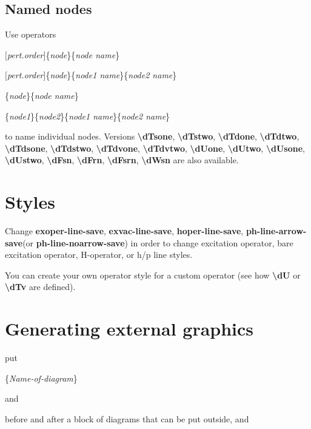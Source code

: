 \documentclass[a4paper]{article}
\newcommand{\myind}{\hspace{10pt}}
\begin{document}
\subsection{Named nodes}

Use operators

\myind{\bf \textbackslash dTone}$[${\it pert.order}$]$\{{\it node}\}\{{\it node name}\}

\myind{\bf \textbackslash dTtwo}$[${\it pert.order}$]$\{{\it node}\}\{{\it node1 name}\}\{{\it node2 name}\}

\myind{\bf \textbackslash dFn}\{{\it node}\}\{{\it node name}\}

\myind{\bf \textbackslash dWn}\{{\it node1}\}\{{\it node2}\}\{{\it node1 name}\}\{{\it node2 name}\}

to name individual nodes. Versions
{\bf \textbackslash dTsone},
{\bf \textbackslash dTstwo},
{\bf \textbackslash dTdone},
{\bf \textbackslash dTdtwo},
{\bf \textbackslash dTdsone},
{\bf \textbackslash dTdstwo},
{\bf \textbackslash dTdvone},
{\bf \textbackslash dTdvtwo},
{\bf \textbackslash dUone},
{\bf \textbackslash dUtwo},
{\bf \textbackslash dUsone},
{\bf \textbackslash dUstwo},
{\bf \textbackslash dFsn},
{\bf \textbackslash dFrn},
{\bf \textbackslash dFsrn},
{\bf \textbackslash dWsn}
are also available.

\section{Styles}\label{sec:Styles}

Change {\bf exoper-line-save}, {\bf exvac-line-save}, {\bf hoper-line-save}, {\bf ph-line-arrow-save}(or {\bf ph-line-noarrow-save})
in order to change excitation operator, bare excitation operator, H-operator, or h/p line styles.

You can create your own operator style for a custom operator (see how {\bf \textbackslash dU} or {\bf \textbackslash dTv} are 
defined).

\section{Generating external graphics}

put 

\myind{\bf \textbackslash beginpgfgraphicnamed}\{{\it Name-of-diagram}\}

and

\myind{\bf \textbackslash endpgfgraphicnamed}

before and after a block of diagrams that can be put outside, and 
\end{document}

